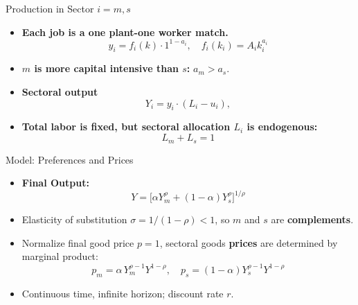 \documentclass[9pt,xcolor={svgnames}]{beamer}
\begin{document}
\begin{frame}{Production in Sector $i=m,s$}
  \begin{itemize}
    \item \textbf{Each job is a one plant-one worker match.} %
      \[
        y_i  =  f_i(k) \cdot 1^{1-a_i}, \quad f_i(k_i) =A_i k_i^{a_i}
      \]
    
      \medskip
      \item \textbf{$m$ is more capital intensive than $s$:} $a_m > a_s$.
    
    
    \medskip
    \item \textbf{Sectoral output}
      \[
       Y_i = y_i \cdot (L_i-u_i),
      \]
    \medskip
    \item \textbf{Total labor is fixed, but sectoral allocation $L_i$ is endogenous:}
      \[
        L_m+L_s =1
      \]


  \end{itemize}
\end{frame}


\begin{frame}{Model: Preferences and Prices}
  \begin{itemize}
    \item \textbf{Final Output:}
      \[
        Y = \bigl[ \alpha Y_m^\rho + (1-\alpha)Y_s ^\rho \bigr]^{1/\rho}
      \]
    \medskip
\item Elasticity of substitution $\sigma = 1/(1-\rho) <1$, so $m$ and $s$ are \textbf{complements}. 
\medskip
    \item Normalize final good price $p=1$, sectoral goods \textbf{prices} are determined by marginal product:
      \[
        p_m = \alpha\,Y_m^{\rho-1}Y^{1-\rho}, \quad
        p_s = (1-\alpha)Y_s ^{\rho-1}Y^{1-\rho}
      \]
\item Continuous time, infinite horizon; discount rate $r$.
  \end{itemize}
  
\end{frame}
\end{document}
